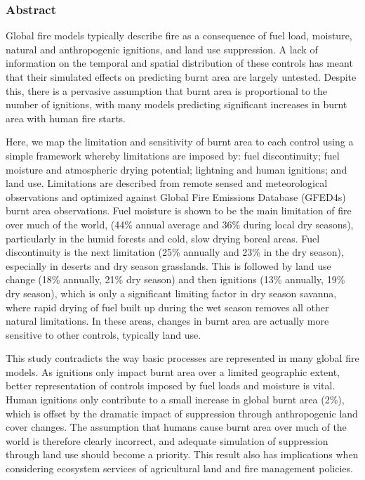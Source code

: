 \documentclass[12pt]{article}
\begin{document}
\subsubsection{Abstract}
Global fire models typically describe fire as a consequence of fuel load, moisture, natural and anthropogenic
ignitions, and land use suppression. A lack of information on the temporal and spatial distribution of these
controls has meant that their simulated effects on predicting burnt area are largely untested. Despite this,
there is a pervasive assumption that burnt area is proportional to the number of ignitions, with many models
predicting significant increases in burnt area with human fire starts.


Here, we map the limitation and sensitivity of burnt area to each control using a simple framework whereby
limitations are imposed by: fuel discontinuity; fuel moisture and atmospheric drying potential; lightning and
human ignitions; and land use. Limitations are described from remote sensed and meteorological
observations and optimized against Global Fire Emissions Database (GFED4s) burnt area observations.
Fuel moisture is shown to be the main limitation of fire over much of the world, (44\% annual average and
36\% during local dry seasons), particularly in the humid forests and cold, slow drying boreal areas. Fuel
discontinuity is the next limitation (25\% annually and 23\% in the dry season), especially in deserts and dry
season grasslands. This is followed by land use change (18\% annually, 21\% dry season) and then ignitions
(13\% annually, 19\% dry season), which is only a significant limiting factor in dry season savanna, where
rapid drying of fuel built up during the wet season removes all other natural limitations. In these areas,
changes in burnt area are actually more sensitive to other controls, typically land use.


This study contradicts the way basic processes are represented in many global fire models. As ignitions only
impact burnt area over a limited geographic extent, better representation of controls imposed by fuel loads
and moisture is vital. Human ignitions only contribute to a small increase in global burnt area (2\%), which is
offset by the dramatic impact of suppression through anthropogenic land cover changes. The assumption
that humans cause burnt area over much of the world is therefore clearly incorrect, and adequate simulation
of suppression through land use should become a priority. This result also has implications when considering
ecosystem services of agricultural land and fire management policies.
\end{document}
